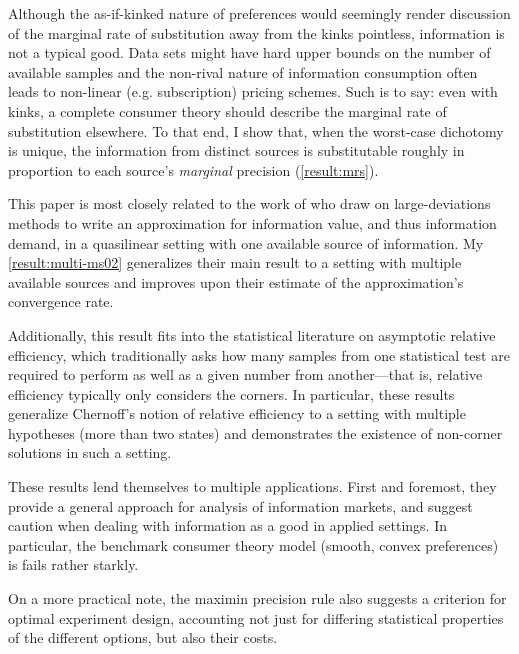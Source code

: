 \documentclass{fancyArticle}
\renewcommand{\|}{\,|\,}                    %
\providecommand{\;}{\,;}                    %
\begin{document}
Although the as-if-kinked nature of preferences would seemingly render discussion of the marginal rate of substitution away from the kinks pointless, information is not a typical good.
Data sets might have hard upper bounds on the number of available samples and the non-rival nature of information consumption often leads to non-linear (e.g. subscription) pricing schemes.
Such is to say: even with kinks, a complete consumer theory should describe the marginal rate of substitution elsewhere.
To that end, I show that, when the worst-case dichotomy is unique, the information from distinct sources is substitutable roughly in proportion to each source's \textit{marginal} precision (\autoref{result:mrs}).

This paper is most closely related to the work of \cite{Moscarini2002} who draw on large-deviations methods to write an approximation for information value, and thus information demand, in a quasilinear setting with one available source of information.
My \autoref{result:multi-ms02} generalizes their main result to a setting with multiple available sources and improves upon their estimate of the approximation's convergence rate.

Additionally, this result fits into the statistical literature on asymptotic relative efficiency, which traditionally asks how many samples from one statistical test are required to perform as well as a given number from another---that is, relative efficiency typically only considers the corners.
In particular, these results generalize Chernoff's \citeyearpar{Chernoff1952} notion of relative efficiency to a setting with multiple hypotheses (more than two states) and demonstrates the existence of non-corner solutions in such a setting.

These results lend themselves to multiple applications.
First and foremost, they provide a general approach for analysis of information markets, and suggest caution when dealing with information as a good in applied settings.
In particular, the benchmark consumer theory model (smooth, convex preferences) is fails rather starkly.

On a more practical note, the maximin precision rule also suggests a criterion for optimal experiment design, accounting not just for differing statistical properties of the different options, but also their costs.\footnotemark\
\end{document}
